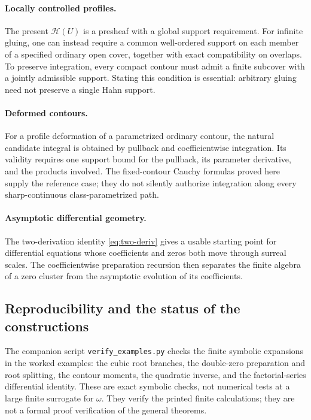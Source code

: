 \documentclass[11pt,a4paper]{article}
\numberwithin{equation}{section}
\theoremstyle{definition}
\newcommand{\HH}{\mathscr H}
\begin{document}
\paragraph{Locally controlled profiles.}
The present $\HH(U)$ is a presheaf with a global support requirement. For
infinite gluing, one can instead require a common well-ordered support on each
member of a specified ordinary open cover, together with exact compatibility
on overlaps. To preserve integration, every compact contour must admit a
finite subcover with a jointly admissible support. Stating this condition is
essential: arbitrary gluing need not preserve a single Hahn support.

\paragraph{Deformed contours.}
For a profile deformation of a parametrized ordinary contour, the natural
candidate integral is obtained by pullback and coefficientwise integration.
Its validity requires one support bound for the pullback, its parameter
derivative, and the products involved. The fixed-contour Cauchy formulas proved
here supply the reference case; they do not silently authorize integration
along every sharp-continuous class-parametrized path.

\paragraph{Asymptotic differential geometry.}
The two-derivation identity \eqref{eq:two-deriv} gives a usable starting point
for differential equations whose coefficients and zeros both move through
surreal scales. The coefficientwise preparation recursion then separates the
finite algebra of a zero cluster from the asymptotic evolution of its
coefficients.

\subsection{Reproducibility and the status of the constructions}

The companion script \texttt{verify\_examples.py} checks the finite symbolic
expansions in the worked examples: the cubic root branches, the double-zero
preparation and root splitting, the contour moments, the quadratic inverse,
and the factorial-series differential identity. These are exact symbolic
checks, not numerical tests at a large finite surrogate for $\omega$.
They verify the printed finite calculations; they are not a formal proof
verification of the general theorems.
\end{document}
